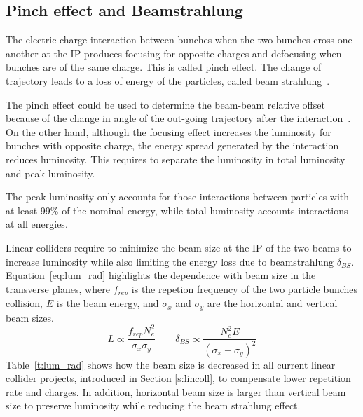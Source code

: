 \subsection{Pinch effect and Beamstrahlung}\label{s:beastr}
The electric charge interaction between bunches when the two bunches cross one another at the IP produces focusing for opposite charges and defocusing when bunches are of the same charge. This is called pinch effect. The change of trajectory leads to a loss of energy of the particles, called beam strahlung~\cite{Schulte:331845}.\par
The pinch effect could be used to determine the beam-beam relative offset because of the change in angle of the out-going trajectory after the interaction~\cite{Bambade:1989pb}. On the other hand, although the focusing effect increases the luminosity for bunches with opposite charge, the energy spread generated by the interaction reduces luminosity. This requires to separate the luminosity in total luminosity and peak luminosity.\par
The peak luminosity only accounts for those interactions between particles with at least 99\% of the nominal energy, while total luminosity accounts interactions at all energies.\par
Linear colliders require to minimize the beam size at the IP of the two beams to increase luminosity while also limiting the energy loss due to beamstrahlung $\delta_{BS}$. Equation~\ref{eq:lum_rad} highlights the dependence with beam size in the transverse planes, where $f_{rep}$ is the repetion frequency of the two particle bunches collision, $E$ is the beam energy, and $\sigma_x$ and $\sigma_y$ are the horizontal and vertical beam sizes.
\begin{equation}
 L \propto \frac{f_{rep}N_e^2}{\sigma_x\sigma_y}\qquad\delta_{BS}\propto\frac{N_e^2E}{(\sigma_x+\sigma_y)^2}\label{eq:lum_rad}
\end{equation}
Table~\ref{t:lum_rad} shows how the beam size is decreased in all current linear collider projects, introduced in Section \ref{s:lincoll}, to compensate lower repetition rate and charges. In addition, horizontal beam size is larger than vertical beam size to preserve luminosity while reducing the beam strahlung effect.\par
